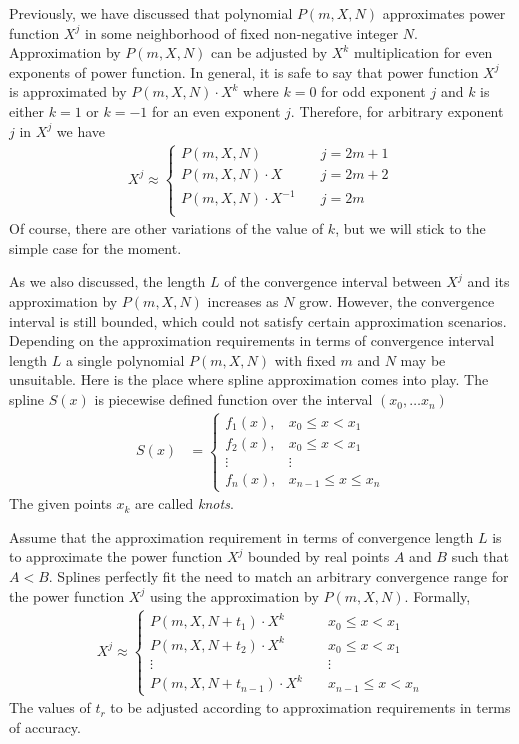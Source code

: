 Previously, we have discussed that polynomial $P(m,X,N)$ approximates power function $X^j$
in some neighborhood of fixed non-negative integer $N$.
Approximation by $P(m,X,N)$ can be adjusted by $X^k$ multiplication for even exponents of power function.
In general, it is safe to say that power function $X^j$ is approximated by $P(m,X,N) \cdot X^k$
where $k=0$ for odd exponent $j$ and $k$ is either $k=1$ or $k=-1$ for an even exponent $j$.
Therefore, for arbitrary exponent $j$ in $X^j$ we have
\begin{align*}
    X^j \approx
    \begin{cases}
        P(m,X,N) \quad         & j=2m+1 \\
        P(m,X,N) \cdot X \quad & j=2m+2 \\
        P(m,X,N) \cdot X^{-1} \quad & j=2m \\
    \end{cases}
\end{align*}
Of course, there are other variations of the value of $k$, but we will stick to the simple case for the moment.

As we also discussed, the length $L$ of the convergence interval between $X^j$ and its approximation by $P(m,X,N)$
increases as $N$ grow.
However, the convergence interval is still bounded, which could not satisfy certain approximation scenarios.
Depending on the approximation requirements in terms of convergence interval length $L$ a single polynomial $P(m,X,N)$
with fixed $m$ and $N$ may be unsuitable.
Here is the place where spline approximation comes into play.
The spline $S(x)$ is piecewise defined function over the interval $(x_0, \ldots x_n)$
\begin{align*}
    S(x) &=
    \begin{cases}
        f_1(x), & x_0 \leq x < x_1 \\
        f_2(x), & x_0 \leq x < x_1\\
        \vdots & \vdots \\
        f_n(x), & x_{n-1} \leq x \leq x_n
    \end{cases}
\end{align*}
The given points $x_k$ are called \textit{knots}.

Assume that the approximation requirement in terms of convergence length $L$ is to approximate the power function $X^j$
bounded by real points $A$ and $B$ such that $A < B$.
Splines perfectly fit the need to match an arbitrary convergence range for the power function $X^j$ using the
approximation by $P(m,X,N)$.
Formally,
\begin{align*}
    X^j \approx
    \begin{cases}
        P(m,X,N+t_1) \cdot X^{k} \quad & x_0 \leq x < x_1 \\
        P(m,X,N+t_2) \cdot X^{k} \quad & x_0 \leq x < x_1 \\
        \vdots & \vdots \\
        P(m,X,N+t_{n-1}) \cdot X^{k} \quad & x_{n-1} \leq x < x_n
    \end{cases}
\end{align*}
The values of $t_r$ to be adjusted according to approximation requirements in terms of accuracy.

